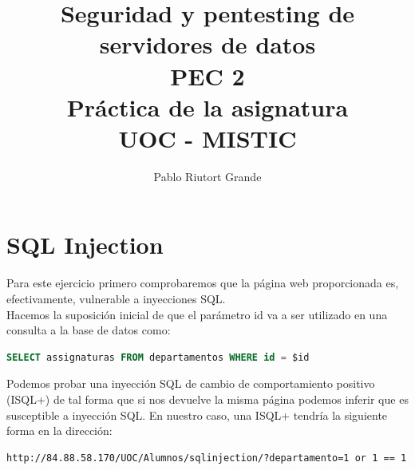 \documentclass[a4paper,oneside]{article}
\author{Pablo Riutort Grande}
\title{
	Seguridad y pentesting de servidores de datos\\
	\vspace{0.5cm}
	PEC 2\\
	\vspace{1cm}
	\textbf{Práctica de la asignatura}
	\vspace{1cm}\\UOC - MISTIC
}
\begin{document}
\maketitle
\pagebreak
\tableofcontents
\lstlistoflistings
\listoffigures
\listoftables

\pagebreak

\section{SQL Injection}
Para este ejercicio primero comprobaremos que la página web proporcionada es, efectivamente, vulnerable a inyecciones SQL.\\
Hacemos la suposición inicial de que el parámetro id va a ser utilizado en una consulta a la base de datos como:
\begin{lstlisting}[language=SQL]
SELECT assignaturas FROM departamentos WHERE id = $id
\end{lstlisting}
Podemos probar una inyección SQL de cambio de comportamiento positivo (ISQL+) de tal forma que si nos devuelve la misma página podemos inferir que es susceptible a inyección SQL. En nuestro caso, una ISQL+ tendría la siguiente forma en la dirección:
\begin{lstlisting}
http://84.88.58.170/UOC/Alumnos/sqlinjection/?departamento=1 or 1 == 1
\end{lstlisting}
\end{document}
